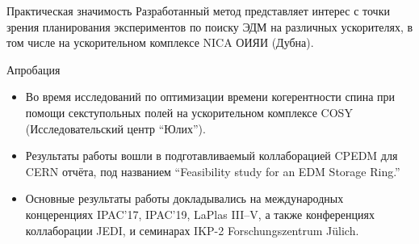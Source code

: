 \documentclass[14pt]{beamer}
\begin{document}
\begin{frame}{Практическая значимость}
	Разработанный метод представляет интерес с точки зрения планирования экспериментов по поиску ЭДМ
	на различных ускорителях, в том числе на ускорительном комплексе NICA ОИЯИ (Дубна).
\end{frame}

\begin{frame}{Апробация}
	\begin{itemize}
		\item Во время исследований по оптимизации времени когерентности спина при помощи секступольных полей на ускорительном комплексе COSY (Исследовательский центр ``Юлих'').
		\item Результаты работы вошли в подготавливаемый коллаборацией CPEDM для CERN отчёта, под названием ``Feasibility study for an EDM Storage Ring.''
		\item Основные результаты работы докладывались на международных концеренциях IPAC'17, IPAC'19, LaPlas III--V, а также конференциях коллаборации JEDI, и семинарах IKP-2 Forschungszentrum J\"ulich.
	\end{itemize}
\end{frame}
\end{document}
